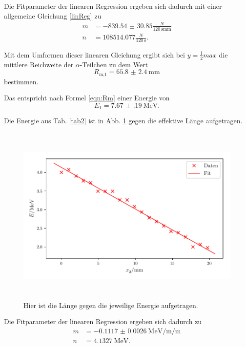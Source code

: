 \noindent Die Fitparameter der linearen Regression ergeben sich dadurch mit einer allgemeine Gleichung \eqref{linReg} zu 
\begin{align*}
    m &= -\num{839.54(3085)} \frac{N}{\SI{120}{\second} \si{\milli\meter}} \\
    n &= \num{108514.077} \frac{N}{\SI{120}{\second}} .
\end{align*}


\noindent Mit dem Umformen dieser linearen Gleichung ergibt sich bei $y = \frac{1}{2} max$ die mittlere Reichweite der $\alpha$-Teilchen zu dem Wert %
\begin{equation*}
    R_\text{m,1} = \SI{65.8(24)}{\milli\meter}
\end{equation*}
bestimmen.

\noindent Das entspricht nach Formel \eqref{eqn:Rm} einer Energie von %
\begin{equation*}
    E_1 = \SI{7.67(19)}{\mega\electronvolt}.
\end{equation*}

Die Energie aus Tab. \ref{tab2} ist in Abb. \ref{fig:energie2} gegen die effektive Länge aufgetragen.
\begin{figure}
    \centering
    \includegraphics[width=12cm, height=9cm]{build/plotd.pdf}
    \caption{Hier ist die Länge gegen die jeweilige Energie aufgetragen.}
    \label{fig:energie2}
\end{figure}

\noindent Die Fitparameter der linearen Regression ergeben sich dadurch zu 
\begin{align*}
    m &= -\SI{0.1117(26)}{\mega\electronvolt\per\milli\per\meter} \\
    n &= \SI{4.1327}{\mega\electronvolt} .
\end{align*}

